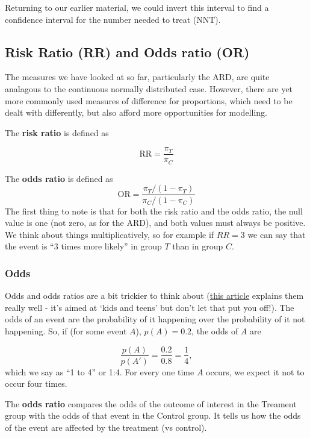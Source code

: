 \documentclass[
  openany]{book}
\theoremstyle{definition}
\theoremstyle{definition}
\theoremstyle{definition}
\theoremstyle{definition}
\theoremstyle{remark}
\begin{document}
Returning to our earlier material, we could invert this interval to find a confidence interval for the number needed to treat (NNT).

\subsection{Risk Ratio (RR) and Odds ratio (OR)}\label{risk-ratio-rr-and-odds-ratio-or}

The measures we have looked at so far, particularly the ARD, are quite analagous to the continuous normally distributed case. However, there are yet more commonly used measures of difference for proportions, which need to be dealt with differently, but also afford more opportunities for modelling.

The \textbf{risk ratio} is defined as

\[\text{RR} = \frac{\pi_T}{\pi_C}\]

The \textbf{odds ratio} is defined as
\[\text{OR} = \frac{\pi_T/\left(1-\pi_T\right)}{\pi_C/\left(1-\pi_C\right)}\]
The first thing to note is that for both the risk ratio and the odds ratio, the null value is one (not zero, as for the ARD), and both values must always be positive. We think about things multiplicatively, so for example if \(RR=3\) we can say that the event is ``3 times more likely'' in group \(T\) than in group \(C\).

\subsubsection*{Odds}\label{odds}

Odds and odds ratios are a bit trickier to think about (\href{https://kids.frontiersin.org/articles/10.3389/frym.2022.926624\#:~:text=As\%20an\%20example\%2C\%20if\%20the,disease\%20if\%20you\%20are\%20exposed.}{this article} explains them really well - it's aimed at `kids and teens' but don't let that put you off!). The odds of an event are the probability of it happening over the probability of it not happening. So, if (for some event \(A\)), \(p\left(A\right)=0.2\), the odds of \(A\) are

\[\frac{p\left(A\right)}{p\left(A'\right)} = \frac{0.2}{0.8} = \frac{1}{4}, \]
which we say as ``1 to 4'' or 1:4. For every one time \(A\) occurs, we expect it not to occur four times.

The \textbf{odds ratio} compares the odds of the outcome of interest in the Treament group with the odds of that event in the Control group. It tells us how the odds of the event are affected by the treatment (vs control).
\end{document}
